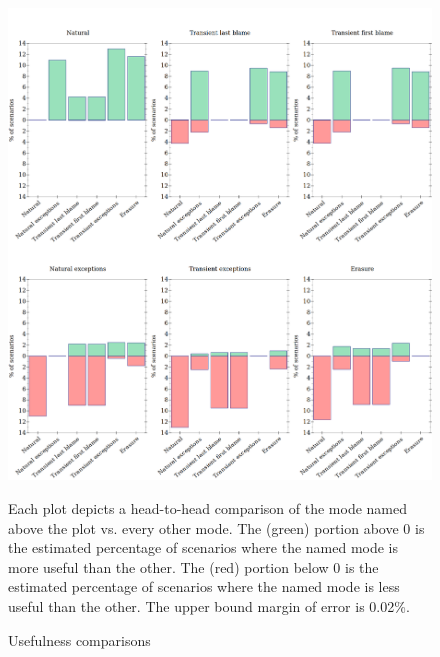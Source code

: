 \begin{figure} \footnotesize 
  \centering
  \includegraphics[width=\textwidth]{./plots/avo-bars}

  \vspace{1em}
  \begin{minipage}{0.95\textwidth}
      Each plot depicts a head-to-head comparison of the mode named above the
      plot vs. every other mode.  The (green) portion above 0 is the estimated
      percentage of scenarios where the named mode is more useful than the
      other.  The (red) portion below 0 is the estimated percentage of scenarios
      where the named mode is less useful than the other.  The upper bound
      margin of error is 0.02\%.
  \end{minipage}

  \caption{Usefulness comparisons}
  \label{fig:avo-bars}
\end{figure}

